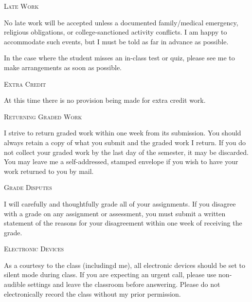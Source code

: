 \documentclass{tufte-handout}
\begin{document}
\begin{center}
\textsc{Late Work}
\end{center}
No late work will be accepted unless a documented family/medical emergency, religious obligations, or college-sanctioned activity conflicts. I am happy to accommodate such events, but I must be told as far in advance as possible.

In the case where the student misses an in-class test or quiz, please see me to make arrangements as soon as possible.

\begin{fullwidth}

\vspace{0.1in}

\begin{center}
\textsc{Extra Credit}
\end{center}
At this time there is no provision being made for extra credit work.

\vspace{0.1in}

\begin{center}
\textsc{Returning Graded Work}
\end{center}
I strive to return graded work within one week from its submission. You should always retain a copy of what you submit and the graded work I return. If you do not collect your graded work by the last day of the semester, it may be discarded. You may leave me a self-addressed, stamped envelope if you wish to have your work returned to you by mail.

\vspace{0.1in}

\begin{center}
\textsc{Grade Disputes}
\end{center}
I will carefully and thoughtfully grade all of your assignments. If you disagree with a grade on any assignment or assessment, you must submit a written statement of the reasons for your disagreement within one week of receiving the grade.

\vspace{0.2in}

\begin{center}
\textsc{Electronic Devices}
\end{center}
As a courtesy to the class (includingd me), all electronic devices should be set to silent mode during class. If you are expecting an urgent call, please use non-audible settings and leave the classroom before answering. Please do not electronically record the class without my prior permission.

\end{fullwidth}
\end{document}
